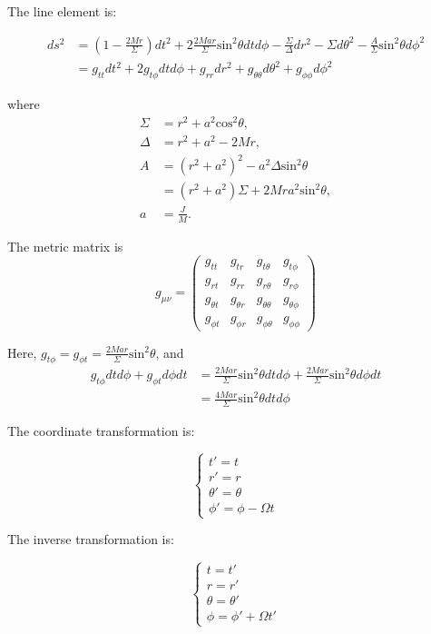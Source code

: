 \documentclass[english]{article}
\begin{document}
The line element is:

\begin{align*}
ds^{2} & =\left(1-\frac{2Mr}{\Sigma}\right)dt^{2}+2\frac{2Mar}{\Sigma}\text{sin}^{2}\theta dtd\phi-\frac{\Sigma}{\Delta}dr^{2}-\Sigma d\theta^{2}-\frac{A}{\Sigma}\text{sin}^{2}\theta d\phi^{2}\\
 & =g_{tt}dt^{2}+2g_{t\phi}dtd\phi+g_{rr}dr^{2}+g_{\theta\theta}d\theta^{2}+g_{\phi\phi}d\phi^{2}
\end{align*}

where 
\begin{align*}
\Sigma & =r^{2}+a^{2}\text{cos}^{2}\theta,\\
\Delta & =r^{2}+a^{2}-2Mr,\\
A & =\left(r^{2}+a^{2}\right)^{2}-a^{2}\Delta\text{sin}^{2}\theta\\
 & =\left(r^{2}+a^{2}\right)\Sigma+2Mra^{2}\text{sin}^{2}\theta,\\
a & =\frac{J}{M}.
\end{align*}

The metric matrix is 
\[
g_{\mu\nu}=\begin{pmatrix}g_{tt} & g_{tr} & g_{t\theta} & g_{t\phi}\\
g_{rt} & g_{rr} & g_{r\theta} & g_{r\phi}\\
g_{\theta t} & g_{\theta r} & g_{\theta\theta} & g_{\theta\phi}\\
g_{\phi t} & g_{\phi r} & g_{\phi\theta} & g_{\phi\phi}
\end{pmatrix}
\]

Here, $g_{t\phi}=g_{\phi t}=\frac{2Mar}{\Sigma}\text{sin}^{2}\theta$,
and 
\begin{align*}
g_{t\phi}dtd\phi+g_{\phi t}d\phi dt & =\frac{2Mar}{\Sigma}\text{sin}^{2}\theta dtd\phi+\frac{2Mar}{\Sigma}\text{sin}^{2}\theta d\phi dt\\
 & =\frac{4Mar}{\Sigma}\text{sin}^{2}\theta dtd\phi
\end{align*}

The coordinate transformation is:

\[
\begin{cases}
t'=t\\
r'=r\\
\theta'=\theta\\
\phi'=\phi-\Omega t
\end{cases}
\]

The inverse transformation is:

\[
\begin{cases}
t=t'\\
r=r'\\
\theta=\theta'\\
\phi=\phi'+\Omega t'
\end{cases}
\]
\end{document}
